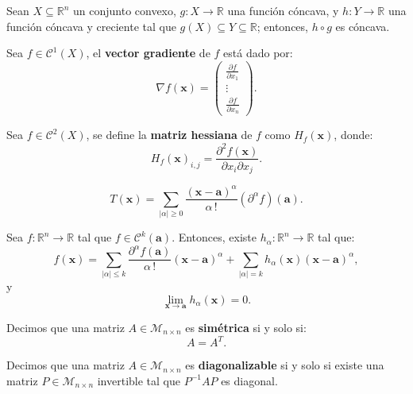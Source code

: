 \documentclass[8pt,a4paper]{extarticle}
\begin{document}
\begin{multicols}{3}
\begin{boxprop}
	Sean $X \subseteq \mathbb{R}^n$ un conjunto convexo, $g : X \to \mathbb{R}$ una función cóncava, y $h : Y \to \mathbb{R}$ una función cóncava y creciente tal que $g(X) \subseteq Y \subseteq \mathbb{R}$; entonces, $h \circ g$ es cóncava.
\end{boxprop}

\begin{boxdef}
	Sea $f \in \mathcal{C}^1 (X)$, el \textbf{vector gradiente} de $f$ está dado por:
	\[
		\nabla f(\mathbf{x}) =
		\begin{pmatrix} \displaystyle \frac{\partial f}{\partial x_1} \\ \vdots \\ \displaystyle \frac{\partial f}{\partial x_n} \end{pmatrix} 
	.\] 
\end{boxdef}

\begin{boxdef}
	Sea $f \in \mathcal{C}^2 (X)$, se define la \textbf{matriz hessiana} de $f$ como $H_f(\mathbf{x})$, donde:
	\[
		H_f (\mathbf{x})_{i,j} = \frac{\partial^2 f(\mathbf{x})}{\partial x_i \partial x_j} 
	.\] 
\end{boxdef}

\begin{boxdef}
	\[
		T(\mathbf{x}) = \sum_{|\alpha| \ge 0} \frac{(\mathbf{x} - \mathbf{a})^\alpha}{\alpha\,!} \left(\partial^\alpha f \right)(\mathbf{a})
	.\] 
\end{boxdef}

\begin{boxtheo}[de Taylor]
	Sea $f : \mathbb{R}^n \to \mathbb{R}$ tal que $f \in \mathcal{C}^k(\mathbf{a})$. Entonces, existe $h_{\alpha} : \mathbb{R}^n \to \mathbb{R}$ tal que:
	\[
		f(\mathbf{x}) = \sum_{|\alpha| \le k} \frac{\partial^\alpha f(\mathbf{a})}{\alpha\,!} (\mathbf{x} - \mathbf{a})^\alpha + \sum_{|\alpha| = k} h_{\alpha}(\mathbf{x})(\mathbf{x} - \mathbf{a})^\alpha
	,\] 
	y
	\[
		\lim_{\mathbf{x} \to \mathbf{a}} h_{\alpha} (\mathbf{x}) = 0
	.\] 
\end{boxtheo}

\begin{boxdef}
	Decimos que una matriz $A \in \mathcal{M}_{n \times n}$ es \textbf{simétrica} si y solo si:
	\[
	A = A^T
	.\] 
\end{boxdef}

\begin{boxdef}
	Decimos que una matriz $A \in \mathcal{M}_{n \times n}$ es \textbf{diagonalizable} si y solo si existe una matriz $P  \in \mathcal{M}_{n \times n}$ invertible tal que $P^{-1}AP$ es diagonal.
\end{boxdef}


\end{multicols}
\end{document}
